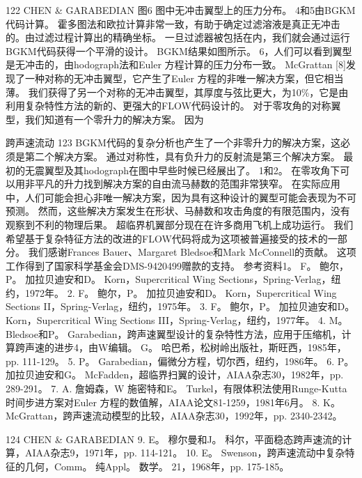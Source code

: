 \documentclass[UTF8,11pt,a4paper,openany,fontset=fandol]{ctexbook}
\begin{document}
122 CHEN \& GARABEDIAN 图6 图中无冲击翼型上的压力分布。 4和5由BGKM代码计算。 霍多图法和欧拉计算非常一致，有助于确定过滤溶液是真正无冲击的。由过滤过程计算出的精确坐标。 一旦过滤器被包括在内，我们就会通过运行BGKM代码获得一个平滑的设计。 BGKM结果如图所示。 6，人们可以看到翼型是无冲击的，由hodograph法和Euler 方程计算的压力分布一致。 McGrattan [8]发现了一种对称的无冲击翼型，它产生了Euler 方程的非唯一解决方案，但它相当薄。 我们获得了另一个对称的无冲击翼型，其厚度与弦比更大，为10\%，它是由利用复杂特性方法的新的、更强大的FLOW代码设计的。 对于零攻角的对称翼型，我们知道有一个零升力的解决方案。 因为

跨声速流动 123 BGKM代码的复杂分析也产生了一个非零升力的解决方案，这必须是第二个解决方案。 通过对称性，具有负升力的反射流是第三个解决方案。 最初的无震翼型及其hodograph在图中早些时候已经展出了。 1和2。 在零攻角下可以用非平凡的升力找到解决方案的自由流马赫数的范围非常狭窄。 在实际应用中，人们可能会担心非唯一解决方案，因为具有这种设计的翼型可能会表现为不可预测。 然而，这些解决方案发生在形状、马赫数和攻击角度的有限范围内，没有观察到不利的物理后果。 超临界机翼部分现在在许多商用飞机上成功运行。 我们希望基于复杂特征方法的改进的FLOW代码将成为这项被普遍接受的技术的一部分。 我们感谢Frances Bauer、Margaret Bledsoe和Mark McConnell的贡献。 这项工作得到了国家科学基金会DMS-9420499赠款的支持。 参考资料1。 F。 鲍尔，P。 加拉贝迪安和D。 Korn，Supercritical Wing Sections，Spring-Verlag，纽约，1972年。 2. F。 鲍尔，P。 加拉贝迪安和D。 Korn，Supercritical Wing Sections II，Spring-Verlag，纽约，1975年。 3. F。 鲍尔，P。 加拉贝迪安和D。 Korn，Supercritical Wing Sections III，Spring-Verlag，纽约，1977年。 4. M。 Bledsoe和P。 Garabedian，跨声速翼型设计的复杂特性方法，应用于压缩机，计算跨声速的进步4，由W编辑。 G。 哈巴希，松树岭出版社，斯旺西，1985年，pp. 111-129。 5. P。 Garabedian，偏微分方程，切尔西，纽约，1986年。 6. P。 加拉贝迪安和G。 McFadden，超临界扫翼的设计，AIAA杂志30，1982年，pp. 289-291。 7. A. 詹姆森，W 施密特和E。 Turkel，有限体积法使用Runge-Kutta时间步进方案对Euler 方程的数值解，AIAA论文81-1259，1981年6月。 8. K。 McGrattan，跨声速流动模型的比较，AIAA杂志30，1992年，pp. 2340-2342。

124 CHEN \& GARABEDIAN 9. E。 穆尔曼和J。 科尔，平面稳态跨声速流的计算，AIAA杂志9，1971年，pp. 114-121。 10. E。 Swenson，跨声速流动中复杂特征的几何，Comm。 纯Appl。 数学。 21，1968年，pp. 175-185。

\clearpage
\end{document}
